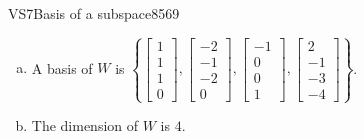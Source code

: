 \begin{exercise}{VS7}{Basis of a subspace}{8569}
\begin{exerciseAnswer}
 

\begin{enumerate}[(a)]
\item 

A basis of \(W\) is \(\left\{ \left[\begin{array}{c}
1 \\
1 \\
1 \\
0
\end{array}\right] , \left[\begin{array}{c}
-2 \\
-1 \\
-2 \\
0
\end{array}\right] , \left[\begin{array}{c}
-1 \\
0 \\
0 \\
1
\end{array}\right] , \left[\begin{array}{c}
2 \\
-1 \\
-3 \\
-4
\end{array}\right] \right\}\).


\item 

The dimension of \(W\) is \(4\).


\end{enumerate}

     \end{exerciseAnswer}
 \end{exercise}


